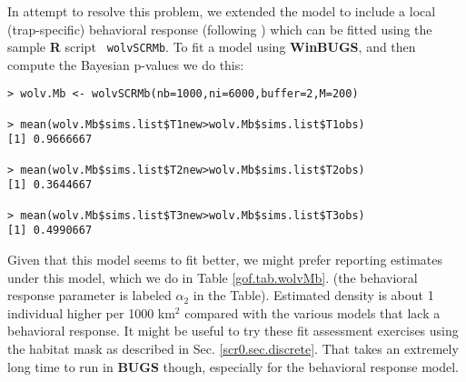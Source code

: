 In attempt to resolve this problem, we extended the model to include a
local (trap-specific)
behavioral response (following \citet{royle_etal:2011jwm}) which can
be fitted using the sample {\bf R} script \mbox{\tt
  wolvSCRMb}. 
To fit a model using {\bf WinBUGS}, and then compute the
Bayesian p-values we do this:
\begin{verbatim}
> wolv.Mb <- wolvSCRMb(nb=1000,ni=6000,buffer=2,M=200)

> mean(wolv.Mb$sims.list$T1new>wolv.Mb$sims.list$T1obs)
[1] 0.9666667

> mean(wolv.Mb$sims.list$T2new>wolv.Mb$sims.list$T2obs)
[1] 0.3644667

> mean(wolv.Mb$sims.list$T3new>wolv.Mb$sims.list$T3obs)
[1] 0.4990667
\end{verbatim}
Given that this model seems to fit better, we might prefer reporting
estimates under this model, which we do in Table \ref{gof.tab.wolvMb}.
(the behavioral response parameter is labeled $\alpha_2$ in the
Table).  Estimated density is about 1 individual higher per 1000
km$^2$ compared with the various models that lack a behavioral
response.  It might be useful to try these fit assessment exercises
using the habitat mask as described in
Sec. \ref{scr0.sec.discrete}. That takes an extremely long time to run
in \mbox{\bf BUGS} though, especially for the behavioral response
model.



